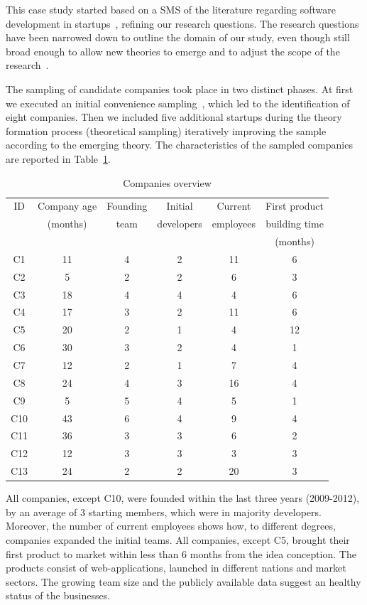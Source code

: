 \documentclass[10pt,journal,letterpaper,compsoc]{IEEEtran}
\begin{document}
This case study started based on a SMS of the literature regarding software
development in startups~\cite{SMS}, refining our research questions. The 
research questions have been narrowed down to outline the domain
of our study, even though still broad enough to allow new theories to emerge and
to adjust the scope of the research~\cite{Corbin1990}.

The sampling of candidate companies took place in two distinct phases. At first
we executed an initial convenience sampling~\cite{Dawson2009}, which led to the
identification of eight companies. Then we included five additional startups
during the theory formation process (theoretical sampling) iteratively improving
the sample according to the emerging theory. The characteristics of the sampled
companies are reported in Table~\ref{t_interviews-stats}.


\begin{table}[!t]
\renewcommand{\arraystretch}{1.3}
\caption{Companies overview}
\label{t_interviews-stats}
\centering
\begin{tabular}{|c||c||c||c||c||c|}

\hline
    ID & Company age & Founding & Initial & Current & First product \\
    & (months) & team & developers & employees & building time \\
                    & & & & & (months) \\
   \hline
C1 & 11 & 4 & 2 & 11 & 6 \\
C2 & 5 & 2 & 2 & 6 & 3 \\
C3 & 18 & 4 & 4 & 4 & 6 \\
C4 & 17 & 3 & 2 & 11 & 6 \\
C5 & 20 & 2 & 1 & 4 & 12 \\
C6 & 30 & 3 & 2 & 4 & 1 \\
C7 & 12 & 2 & 1 & 7 & 4 \\
C8 & 24 & 4 & 3 & 16 & 4 \\
C9 & 5 & 5 & 4 & 5 & 1 \\
C10 & 43 & 6 & 4 & 9 & 4 \\
C11 & 36 & 3 & 3 & 6 & 2 \\
C12 & 12 & 3 & 3 & 3 & 3 \\
C13 & 24 & 2 & 2 & 20 & 3 \\
 
\hline
\end{tabular}
\end{table}

All companies, except C10, were founded within the last three years (2009-2012),
by an average of 3 starting members, which were in majority developers. 
Moreover, the number of current employees shows how, to different
degrees, companies expanded the initial teams. All companies, except C5,
brought their first product to market within less than 6 months from the idea
conception. The products consist of web-applications, launched in different
nations and market sectors. The growing team size and the publicly available
data suggest an healthy status of the businesses.
\end{document}
